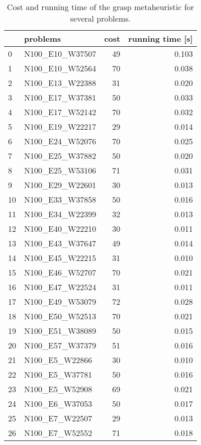 \begin{table}[H]
\centering
\begin{tabular}{llrr}
\toprule
{} &            problems &  cost &  running time [s] \\
\midrule
0  &     N100\_E10\_W37507 &    49 &             0.103 \\
1  &     N100\_E10\_W52564 &    70 &             0.038 \\
2  &     N100\_E13\_W22388 &    31 &             0.020 \\
3  &     N100\_E17\_W37381 &    50 &             0.033 \\
4  &     N100\_E17\_W52142 &    70 &             0.032 \\
5  &     N100\_E19\_W22217 &    29 &             0.014 \\
6  &     N100\_E24\_W52076 &    70 &             0.025 \\
7  &     N100\_E25\_W37882 &    50 &             0.020 \\
8  &     N100\_E25\_W53106 &    71 &             0.031 \\
9  &     N100\_E29\_W22601 &    30 &             0.013 \\
10 &     N100\_E33\_W37858 &    50 &             0.016 \\
11 &     N100\_E34\_W22399 &    32 &             0.013 \\
12 &     N100\_E40\_W22210 &    30 &             0.011 \\
13 &     N100\_E43\_W37647 &    49 &             0.014 \\
14 &     N100\_E45\_W22215 &    31 &             0.010 \\
15 &     N100\_E46\_W52707 &    70 &             0.021 \\
16 &     N100\_E47\_W22524 &    31 &             0.011 \\
17 &     N100\_E49\_W53079 &    72 &             0.028 \\
18 &     N100\_E50\_W52513 &    70 &             0.021 \\
19 &     N100\_E51\_W38089 &    50 &             0.015 \\
20 &     N100\_E57\_W37379 &    51 &             0.016 \\
21 &      N100\_E5\_W22866 &    30 &             0.010 \\
22 &      N100\_E5\_W37781 &    50 &             0.016 \\
23 &      N100\_E5\_W52908 &    69 &             0.021 \\
24 &      N100\_E6\_W37053 &    50 &             0.017 \\
25 &      N100\_E7\_W22507 &    29 &             0.013 \\
26 &      N100\_E7\_W52552 &    71 &             0.018 \\
\bottomrule
\end{tabular}
\caption{Cost and running time of the grasp metaheuristic for several problems.}
\label{table:grasp-medium-results-I}
\end{table}


